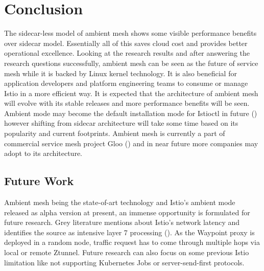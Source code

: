 \section{Conclusion}
The sidecar-less model of ambient mesh shows some visible performance benefits over sidecar model. Essentially all of this saves cloud cost and provides better operational excellence. Looking at the research results and after answering the research questions successfully, ambient mesh can be seen as the future of service mesh while it is backed by Linux kernel technology. It is also beneficial for application developers and platform engineering teams to consume or manage Istio in a more efficient way. It is expected that the architecture of ambient mesh will evolve with its stable releases and more performance benefits will be seen. Ambient mode may become the default installation mode for Istioctl in future (\cite{ambientExplained}) however shifting from sidecar architecture will take some time based on its popularity and current footprints. Ambient mesh is currently a part of commercial service mesh project Gloo (\cite{glooMeshIntro}) and in near future more companies may adopt to its architecture.

\subsection{Future Work}
Ambient mesh being the state-of-art technology and Istio's ambient mode released as alpha version at present, an immense opportunity is formulated for future research. Grey literature mentions about Istio’s network latency and identifies the source as intensive layer 7 processing (\cite{istioHoward2022}). As the Waypoint proxy is deployed in a random node, traffic request has to come through multiple hops via local or remote Ztunnel. Future research can also focus on some previous Istio limitation like not supporting Kubernetes Jobs or  server-send-first protocols.